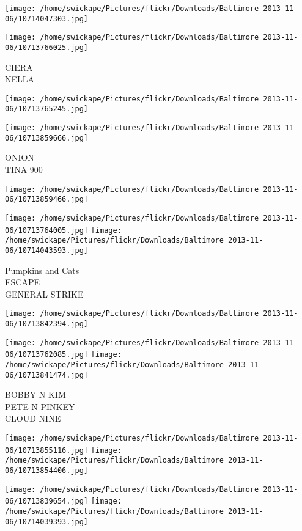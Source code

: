 \documentclass[10pt,letterpaper]{article}
\begin{document}
\texttt{[image: /home/swickape/Pictures/flickr/Downloads/Baltimore 2013-11-06/10714047303.jpg]}

\vspace{0.25in}
\texttt{[image: /home/swickape/Pictures/flickr/Downloads/Baltimore 2013-11-06/10713766025.jpg]}

CIERA\\
NELLA
\pagebreak

\texttt{[image: /home/swickape/Pictures/flickr/Downloads/Baltimore 2013-11-06/10713765245.jpg]}

\vspace{0.25in}
\texttt{[image: /home/swickape/Pictures/flickr/Downloads/Baltimore 2013-11-06/10713859666.jpg]}

ONION\\
TINA 900
\pagebreak

\texttt{[image: /home/swickape/Pictures/flickr/Downloads/Baltimore 2013-11-06/10713859466.jpg]}

\vspace{0.25in}
\texttt{[image: /home/swickape/Pictures/flickr/Downloads/Baltimore 2013-11-06/10713764005.jpg]}
\texttt{[image: /home/swickape/Pictures/flickr/Downloads/Baltimore 2013-11-06/10714043593.jpg]}

Pumpkins and Cats\\
ESCAPE\\
GENERAL STRIKE
\pagebreak

\texttt{[image: /home/swickape/Pictures/flickr/Downloads/Baltimore 2013-11-06/10713842394.jpg]}

\vspace{0.25in}
\texttt{[image: /home/swickape/Pictures/flickr/Downloads/Baltimore 2013-11-06/10713762085.jpg]}
\texttt{[image: /home/swickape/Pictures/flickr/Downloads/Baltimore 2013-11-06/10713841474.jpg]}

BOBBY N KIM\\
PETE N PINKEY\\
CLOUD NINE
\pagebreak

\texttt{[image: /home/swickape/Pictures/flickr/Downloads/Baltimore 2013-11-06/10713855116.jpg]}
\texttt{[image: /home/swickape/Pictures/flickr/Downloads/Baltimore 2013-11-06/10713854406.jpg]}

\texttt{[image: /home/swickape/Pictures/flickr/Downloads/Baltimore 2013-11-06/10713839654.jpg]}
\texttt{[image: /home/swickape/Pictures/flickr/Downloads/Baltimore 2013-11-06/10714039393.jpg]}
\end{document}
